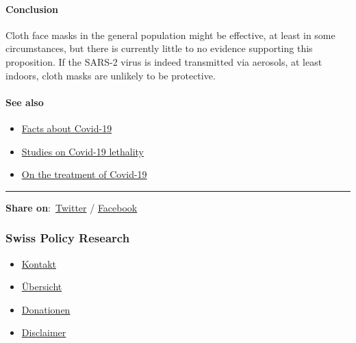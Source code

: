 \hypertarget{conclusion}{%
\paragraph{Conclusion}\label{conclusion}}

Cloth face masks in the general population might be effective, at least
in some circumstances, but there is currently little to no evidence
supporting this proposition. If the SARS-2 virus is indeed transmitted
via aerosols, at least indoors, cloth masks are unlikely to be
protective.

\hypertarget{see-also}{%
\paragraph{See also}\label{see-also}}

\begin{itemize}
\tightlist
\item
  \href{https://swprs.org/a-swiss-doctor-on-covid-19/}{Facts about
  Covid-19}
\item
  \href{https://swprs.org/studies-on-covid-19-lethality/}{Studies on
  Covid-19 lethality}
\item
  \href{https://swprs.org/on-the-treatment-of-covid-19/}{On the
  treatment of Covid-19}
\end{itemize}

\begin{center}\rule{0.5\linewidth}{\linethickness}\end{center}

\textbf{Share
on}:~\href{https://twitter.com/intent/tweet?url=https://swprs.org/face-masks-evidence/}{Twitter}
/
\href{https://www.facebook.com/share.php?u=https://swprs.org/face-masks-evidence/}{Facebook}

\hypertarget{swiss-policy-research}{%
\subsubsection{Swiss Policy Research}\label{swiss-policy-research}}

\begin{itemize}
\tightlist
\item
  \href{https://swprs.org/kontakt/}{Kontakt}
\item
  \href{https://swprs.org/uebersicht/}{Übersicht}
\item
  \href{https://swprs.org/donationen/}{Donationen}
\item
  \href{https://swprs.org/disclaimer/}{Disclaimer}
\end{itemize}

